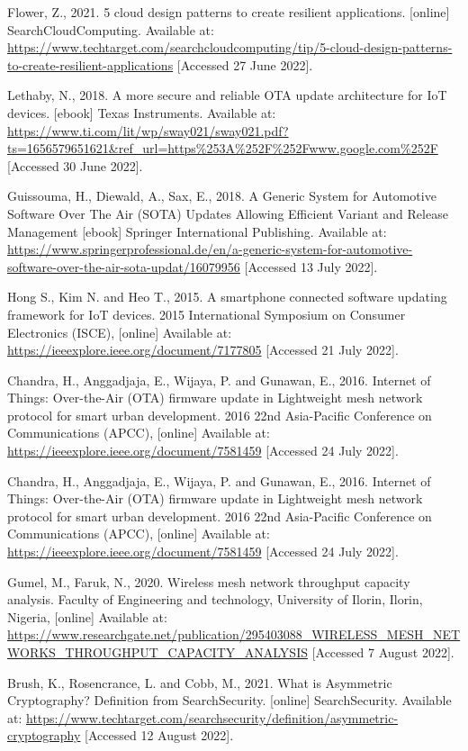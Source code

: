 \documentclass[12pt,a4paper]{article}
\begin{document}
{\begin{thebibliography}{}
Flower, Z., 2021. 5 cloud design patterns to create resilient applications. [online] SearchCloudComputing. Available at: \url{https://www.techtarget.com/searchcloudcomputing/tip/5-cloud-design-patterns-to-create-resilient-applications} [Accessed 27 June 2022].

Lethaby, N., 2018. A more secure and reliable OTA update architecture for IoT devices. [ebook] Texas Instruments. Available at: \url{https://www.ti.com/lit/wp/sway021/sway021.pdf?ts=1656579651621&ref_url=https%253A%252F%252Fwww.google.com%252F} [Accessed 30 June 2022].

Guissouma, H., 	Diewald, A., Sax, E., 2018. A Generic System for Automotive Software Over The Air (SOTA) Updates Allowing Efficient Variant and Release Management [ebook] Springer International Publishing. Available at: \url{https://www.springerprofessional.de/en/a-generic-system-for-automotive-software-over-the-air-sota-updat/16079956} [Accessed 13 July 2022].

Hong S., Kim N. and Heo T., 2015. A smartphone connected software updating framework for IoT devices. 2015 International Symposium on Consumer Electronics (ISCE), [online] Available at: \url{https://ieeexplore.ieee.org/document/7177805} [Accessed 21 July 2022].

Chandra, H., Anggadjaja, E., Wijaya, P. and Gunawan, E., 2016. Internet of Things: Over-the-Air (OTA) firmware update in Lightweight mesh network protocol for smart urban development. 2016 22nd Asia-Pacific Conference on Communications (APCC), [online] Available at: \url{https://ieeexplore.ieee.org/document/7581459} [Accessed 24 July 2022].

Chandra, H., Anggadjaja, E., Wijaya, P. and Gunawan, E., 2016. Internet of Things: Over-the-Air (OTA) firmware update in Lightweight mesh network protocol for smart urban development. 2016 22nd Asia-Pacific Conference on Communications (APCC), [online] Available at: \url{https://ieeexplore.ieee.org/document/7581459} [Accessed 24 July 2022].

Gumel, M., Faruk, N., 2020. Wireless mesh network throughput capacity analysis. Faculty of Engineering and technology, University of Ilorin, Ilorin, Nigeria, [online] Available at: \url{https://www.researchgate.net/publication/295403088_WIRELESS_MESH_NETWORKS_THROUGHPUT_CAPACITY_ANALYSIS} [Accessed 7 August 2022].

Brush, K., Rosencrance, L. and Cobb, M., 2021. What is Asymmetric Cryptography? Definition from SearchSecurity. [online] SearchSecurity. Available at: \url{https://www.techtarget.com/searchsecurity/definition/asymmetric-cryptography} [Accessed 12 August 2022].


\end{thebibliography}}
\end{document}
